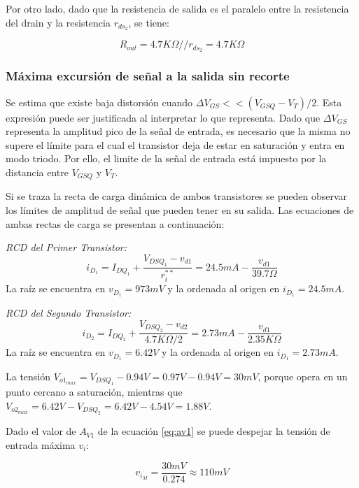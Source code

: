 \documentclass[a4paper, 10pt, spanish]{article}
\begin{document}
Por otro lado, dado que la resistencia de salida es el paralelo entre la resistencia del drain y la resistencia $r_{ds_2}$, se tiene:

\begin{equation}
  R_{out}=4.7K\Omega // r_{ds_2} = 4.7K\Omega
\end{equation}

\subsubsection{Máxima excursión de señal a la salida sin recorte}

Se estima que existe baja distorsión cuando $\Delta V_{GS} << (V_{GSQ}-V_T)/2$. Esta expresión puede ser justificada al interpretar lo que representa. Dado que $\Delta V_{GS}$ representa la amplitud pico de la señal de entrada, es necesario que la misma no supere el límite para el cual el transistor deja de estar en saturación y entra en modo triodo. Por ello, el limite de la señal de entrada está impuesto por la distancia entre $V_{GSQ}$ y $V_T$.

Si se traza la recta de carga dinámica de ambos transistores se pueden observar los límites de amplitud de señal que pueden tener en su salida. Las ecuaciones de ambas rectas de carga se presentan a continuación:

\textit{RCD del Primer Transistor:}
\begin{equation}
  i_{D_1} = I_{DQ_1} + \frac{V_{DSQ_1} - v_{d1}}{r_i^{**}} = 24.5mA - \frac{v_{d1}}{39.7\Omega}
\end{equation}
La raíz se encuentra en $v_{D_1} = 973mV$ y la ordenada al origen en $i_{D_1} = 24.5mA$.

\textit{RCD del Segundo Transistor:}
\begin{equation}
  i_{D_2} = I_{DQ_2} + \frac{V_{DSQ_2} - v_{d2}}{4.7K\Omega/2} = 2.73mA - \frac{v_{d1}}{2.35K\Omega}
\end{equation}
La raíz se encuentra en $v_{D_1} = 6.42V$ y la ordenada al origen en $i_{D_1} = 2.73mA$.

\smallskip
La tensión $V_{o1_{max}}= V_{DSQ_1} - 0.94V = 0.97V - 0.94V = 30mV$, porque opera en un punto cercano a saturación, mientras que $V_{o2_{max}}= 6.42V - V_{DSQ_2} = 6.42V - 4.54V = 1.88V$.

Dado el valor de $A_{V1}$ de la ecuación \ref{eq:av1} se puede despejar la tensión de entrada máxima $v_i$:

\begin{equation}
  v_{i_M}=\frac{30mV}{0.274}\approx110mV
  \label{eq:in_max_teo}
\end{equation}
\end{document}
